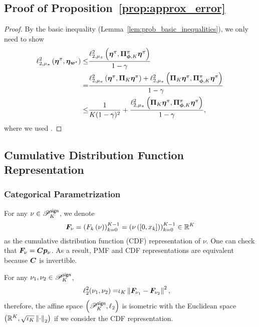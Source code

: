 \subsection{Proof of Proposition~\ref{prop:approx_error}}\label{appendix:proof_approx_error}
\begin{proof}
By the basic inequality (Lemma~\ref{lem:prob_basic_inequalities}), we only need to show
   \begin{equation*}
    \begin{aligned}
        \ell_{2,\mu_{\pi}}^2\left({\bm{\eta}^\pi,\bm{\eta}_{{\bm{w}}^{\star}}}\right)\leq&\frac{\ell_{2,\mu_{\pi}}^2\left({\bm{\eta}^{\pi},{\bm{\Pi}}_{{\bm{\phi}}, K}^{\pi}\bm{\eta}^{\pi}}\right)}{1-\gamma}\\
        =&\frac{\ell_{2,\mu_{\pi}}^2\left({\bm{\eta}^{\pi},{\bm{\Pi}}_{K}\bm{\eta}^{\pi}}\right)+\ell_{2,\mu_{\pi}}^2\left({{\bm{\Pi}}_{K}\bm{\eta}^{\pi},{\bm{\Pi}}_{{\bm{\phi}}, K}^{\pi}\bm{\eta}^{\pi}}\right)}{1-\gamma}\\
       \leq& \frac{1}{K(1-\gamma)^2}+\frac{\ell_{2,\mu_{\pi}}^2\left({{\bm{\Pi}}_K\bm{\eta}^{\pi},{\bm{\Pi}}_{{\bm{\phi}}, K}^{\pi}\bm{\eta}^{\pi}}\right)}{1-\gamma},
    \end{aligned}
\end{equation*}
where we used \citep[Proposition~9.18 and Eqn.~(5.28)][]{bdr2022}.
\end{proof}

\subsection{Cumulative Distribution Function Representation}\label{Appendix:cdf_representation}
\subsubsection{Categorical Parametrization}
For any $\nu\in{\mathscr{P}}^{\mathsf{sign}}_K$, we denote 
\begin{equation*}
    {\bm{F}}_{\nu}=\left({F_k\left({\nu}\right)}\right)_{k=0}^{K-1}=\left({\nu\left({[0, x_k]}\right)}\right)_{k=0}^{K-1}\in{\mathbb R}^{K}
\end{equation*}
as the cumulative distribution function (CDF) representation of $\nu$.
One can check that ${\bm{F}}_{\nu}={\bm{C}}{\bm{p}}_{\nu}$.
As a result, PMF and CDF representations are equivalent because ${\bm{C}}$ is invertible.

For any $\nu_1,\nu_2\in{\mathscr{P}}^{\mathsf{sign}}_K$,
\begin{equation*}
    \begin{aligned}
    \ell_2^2(\nu_1,\nu_2)=&\iota_K\left\|{{\bm{F}}_{\nu_1}-{\bm{F}}_{\nu_2}}\right\|^2,
\end{aligned}
\end{equation*}
therefore, the affine space $\left({{\mathscr{P}}^{\mathsf{sign}}_K, \ell_2}\right)$ is isometric with the Euclidean space $\left({{\mathbb R}^{K}, \sqrt{\iota_K}\left\|{\cdot}\right\|_2}\right)$ if we consider the CDF representation.


